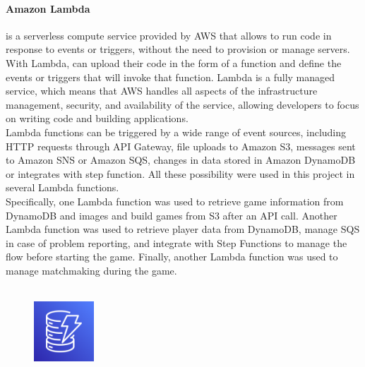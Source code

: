 \documentclass[a4paper,12pt]{report}
\begin{document}
\paragraph{Amazon Lambda} is a serverless compute service provided by AWS that allows to run code in response to events or triggers, without the need to provision or manage servers. With Lambda, can upload their code in the form of a function and define the events or triggers that will invoke that function. Lambda is a fully managed service, which means that AWS handles all aspects of the infrastructure management, security, and availability of the service, allowing developers to focus on writing code and building applications.\\
Lambda functions can be triggered by a wide range of event sources, including HTTP requests through API Gateway, file uploads to Amazon S3, messages sent to Amazon SNS or Amazon SQS, changes in data stored in Amazon DynamoDB or integrates with step function. All these possibility were used in this project in several Lambda functions.\\
Specifically, one Lambda function was used to retrieve game information from DynamoDB and images and build games from S3 after an API call. Another Lambda function was used to retrieve player data from DynamoDB, manage SQS in case of problem reporting, and integrate with Step Functions to manage the flow before starting the game. Finally, another Lambda function was used to manage matchmaking during the game.\\\\
%
%
%
\begin{figure}
  \centering
  \includegraphics[width=0.2\textwidth]{img/services/DynamoDB}
\end{figure}
%
\end{document}
